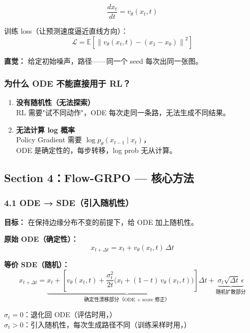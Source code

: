 \[
\frac{dx_t}{dt} = v_\theta(x_t, t)
\]

训练 loss（让预测速度逼近直线方向）：
\[
\mathcal{L} = \mathbb{E}\left[\left\| v_\theta(x_t, t) - (x_1 - x_0) \right\|^2\right]
\]

\begin{intubox}
\textbf{直觉：} 给定初始噪声，路径——同一个 seed 每次出同一张图。
\end{intubox}

\subsubsection{为什么 ODE 不能直接用于 RL？}

\begin{enumerate}[leftmargin=1.5em]
  \item \textbf{没有随机性（无法探索）}\\
    RL 需要"试不同动作"，ODE 每次走同一条路，无法生成不同结果。

  \item \textbf{无法计算 log 概率}\\
    Policy Gradient 需要 $\log p_\theta(x_{t-1} \mid x_t)$，\\
    ODE 是确定性的，每步转移，log prob 无从计算。
\end{enumerate}

\subsection{Section 4：Flow-GRPO — 核心方法}

\subsubsection{4.1 ODE → SDE（引入随机性）}

\textbf{目标：} 在保持边缘分布不变的前提下，给 ODE 加上随机性。

\textbf{原始 ODE（确定性）：}
\[
x_{t+\Delta t} = x_t + v_\theta(x_t, t)\,\Delta t
\]

\textbf{等价 SDE（随机）：}
\[
x_{t+\Delta t} = \underbrace{x_t + \left[v_\theta(x_t,t) + \frac{\sigma_t^2}{2t}\bigl(x_t + (1-t)\,v_\theta(x_t,t)\bigr)\right]\Delta t}_{\text{确定性漂移部分（ODE + score 修正）}} + \underbrace{\sigma_t\sqrt{\Delta t}\,\epsilon}_{\text{随机扩散部分}}
\]

\begin{summarybox}
$\sigma_t = 0$：退化回 ODE（评估时用，）\\
$\sigma_t > 0$：引入随机性，每次生成路径不同（训练采样时用，）
\end{summarybox}

